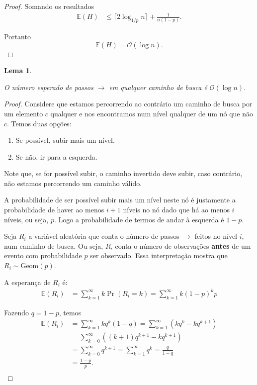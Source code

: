 \documentclass[paper=a4, fontsize=11pt]{scrartcl} %
\newtheorem{lemma}[theorem]{Lema}
\numberwithin{equation}{section}
\numberwithin{figure}{section}
\numberwithin{table}{section}
\numberwithin{definition}{section}
\numberwithin{theorem}{section}
\numberwithin{property}{section}
\numberwithin{proposition}{section}
\newcommand{\cO}{\ensuremath{\mathcal{O}}}
\newcommand{\Exp}{\ensuremath{{\mathbb{E}}}\xspace}
\begin{document}
\begin{proof}
Somando os resultados
\begin{align*}
\Exp(H) &\leq \lceil 2 \log_{1/p} n \rceil + \frac{1}{n(1 - p)}.
\end{align*}

Portanto
$$
\Exp(H) = \cO(\log n).
$$
\end{proof}


\begin{lemma} \label{lemma:rightarrow}

O número esperado de passos $\rightarrow$ em qualquer caminho de busca é $\cO(\log n)$.

\end{lemma}

\begin{proof}
Considere que estamos percorrendo ao contrário um caminho de busca por um elemento $c$ qualquer 
e nos encontramos num nível qualquer de um nó que não $c$. Temos duas opções:
\begin{enumerate}[noitemsep]
  \item Se possível, subir mais um nível. 
  \item Se não, ir para a esquerda.
\end{enumerate}

Note que, se for possível subir, o caminho invertido deve subir, caso contrário, não estamos percorrendo um 
caminho válido.

A probabilidade de ser possível subir mais um nível neste nó é justamente a probabilidade de haver ao menos
$i + 1$ níveis no nó dado que há ao menos $i$ níveis, ou seja, $p$. Logo a probabilidade de termos de andar à
esquerda é $1 - p$.

Seja $R_i$ a variável aleatória que conta o número de passos $\rightarrow$ feitos no nível $i$, num 
caminho de busca. Ou seja, $R_i$ conta o número de observações \textbf{antes} de um evento com probabilidade 
$p$ ser observado. Essa interpretação mostra que $R_i \sim \text{Geom}(p)$. 

A esperança de $R_i$ é:
\begin{align*}
\Exp(R_i)
  &= \sum_{k = 1}^{\infty} k \Pr(R_i = k)= \sum_{k = 1}^{\infty} k (1 - p)^{k} p 
\end{align*}

Fazendo  $q = 1 - p$, temos
\begin{align*}
\Exp(R_i)
  &= \sum_{k = 1}^{\infty} k q^{k} (1 - q) 
    = \sum_{k = 1}^{\infty} \left( k q^{k}  - k q^{k+1} \right)  \\
  &= \sum_{k = 0}^{\infty} \left( (k+1) q^{k+1}  - k q^{k+1} \right) \\
  &= \sum_{k = 0}^{\infty} q^{k+1} 
    = \sum_{k = 1}^{\infty} q^{k}  
    = \frac{q}{1-q} \\
  &= \frac{1 - p}{p}. \\
\end{align*}


\end{proof}
\end{document}
